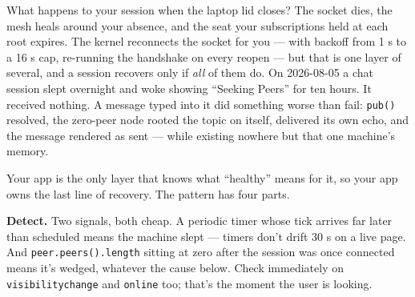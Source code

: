\documentclass[
  nobib]{tufte-handout}
\begin{document}
What happens to your session when the laptop lid closes? The socket
dies, the mesh heals around your absence, and the seat your
subscriptions held at each root expires. The kernel reconnects the
socket for you --- with backoff from 1 s to a 16 s cap, re-running the
handshake on every reopen --- but that is one layer of several, and a
session recovers only if \emph{all} of them do. On 2026-08-05 a chat
session slept overnight and woke showing ``Seeking Peers'' for ten
hours. It received nothing. A message typed into it did something worse
than fail: \texttt{pub()} resolved, the zero-peer node rooted the topic
on itself, delivered its own echo, and the message rendered as sent ---
while existing nowhere but that one machine's memory.

Your app is the only layer that knows what ``healthy'' means for it, so
your app owns the last line of recovery. The pattern has four parts.

\textbf{Detect.} Two signals, both cheap. A periodic timer whose tick
arrives far later than scheduled means the machine slept --- timers
don't drift 30 s on a live page. And \texttt{peer.peers().length}
sitting at zero after the session was once connected means it's wedged,
whatever the cause below. Check immediately on \texttt{visibilitychange}
and \texttt{online} too; that's the moment the user is looking.
\end{document}
